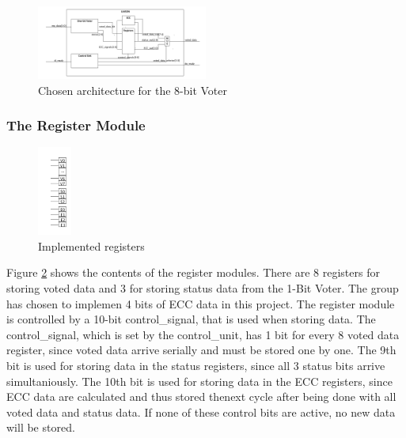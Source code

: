 \documentclass[a4paper]{IEEEtran}
\begin{document}
\begin{figure}[h!]
    \centering
    \includegraphics[width=0.5\textwidth]{Figures/Solution/ArchitectureFinal}
    \caption{Chosen architecture for the 8-bit Voter}
    \label{fig:ArchitectureFinal}
\end{figure}

\subsubsection{The Register Module}
\begin{figure}[h!]
    \centering
    \includegraphics[width=0.10\textwidth]{Figures/Solution/Registers}
    \caption{Implemented registers}
    \label{fig:Registers}
\end{figure}
Figure \ref{fig:Registers} shows the contents of the register modules.
There are 8 registers for storing voted data and 3 for storing status data from the 1-Bit Voter.
The group has chosen to implemen 4 bits of ECC data in this project.
The register module is controlled by a 10-bit control\_signal, that is used when storing data.
The control\_signal, which is set by the control\_unit, has 1 bit for every 8 voted data register, since voted data arrive serially and must be stored one by one.
The 9th bit is used for storing data in the status registers, since all 3 status bits arrive simultaniously.
The 10th bit is used for storing data in the ECC registers, since ECC data are calculated and thus stored thenext  cycle after being done with all voted data and status data.
If none of these control bits are active, no new data will be stored.
\end{document}
